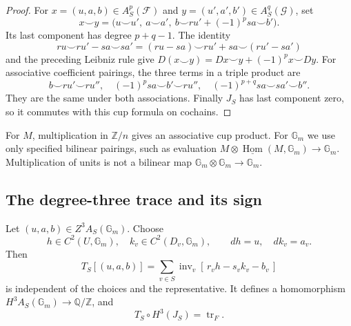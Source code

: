 \begin{proof}
For \(x=(u,a,b)\in A_S^p(\mathcal F)\) and
\(y=(u',a',b')\in A_S^q(\mathcal G)\), set
\begin{equation}
\label{eq:do27-cup}
 x\smile y=
 \bigl(u\smile u',\ a\smile a',\
        b\smile ru'+(-1)^p sa\smile b'\bigr).
\end{equation}
Its last component has degree \(p+q-1\). The identity
\[
 ru\smile ru'-sa\smile sa'
 =(ru-sa)\smile ru'+sa\smile(ru'-sa')
\]
and the preceding Leibniz rule give
\(D(x\smile y)=Dx\smile y+(-1)^px\smile Dy\).
For associative coefficient pairings, the three terms in a triple
product are
\[
 b\smile ru'\smile ru'',\quad
 (-1)^p sa\smile b'\smile ru'',\quad
 (-1)^{p+q}sa\smile sa'\smile b''.
\]
They are the same under both associations. Finally \(J_S\) has last
component zero, so it commutes with this cup formula on cochains.
\end{proof}

For \(M\), multiplication in \(\mathbb Z/n\) gives an associative
cup product. For \(\mathbb G_m\) we use only specified bilinear
pairings, such as evaluation
\(M\otimes\underline{\operatorname{Hom}}(M,\mathbb G_m)\to\mathbb G_m\).
Multiplication of units is not a bilinear map
\(\mathbb G_m\otimes\mathbb G_m\to\mathbb G_m\).

\subsection{The degree-three trace and its sign}

\begin{theorem}
\label{thm:do27-trace}
Let \((u,a,b)\in Z^3 A_S(\mathbb G_m)\). Choose
\[
 h\in C^2(U,\mathbb G_m),\quad
 k_v\in C^2(D_v,\mathbb G_m),\qquad dh=u,\quad dk_v=a_v.
\]
Then
\begin{equation}
\label{eq:do27-trace}
 T_S[(u,a,b)]
   =\sum_{v\in S}\operatorname{inv}_v
           [\,r_vh-s_vk_v-b_v\,]
\end{equation}
is independent of the choices and the representative. It defines a
homomorphism \(H^3 A_S(\mathbb G_m)\to\mathbb Q/\mathbb Z\), and
\[
 T_S\circ H^3(J_S)=\operatorname{tr}_F.
\]
\end{theorem}

